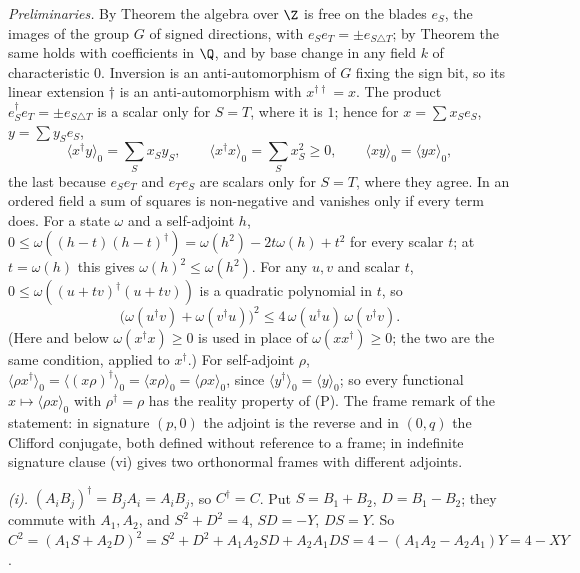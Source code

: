 \emph{Preliminaries.} By Theorem  the algebra over $\Z$ is free on the blades $e_{S}$, the images of the group $G$ of signed directions, with $e_{S}e_{T} = \pm e_{S \triangle T}$; by Theorem  the same holds with coefficients in $\Q$, and by base change in any field $k$ of characteristic $0$. Inversion is an anti-automorphism of $G$ fixing the sign bit, so its linear extension $\dagger$ is an anti-automorphism with $x^{\dagger\dagger} = x$. The product $e_{S}^{\dagger}e_{T} = \pm e_{S \triangle T}$ is a scalar only for $S = T$, where it is $1$; hence for $x = \sum x_{S}e_{S}$, $y = \sum y_{S}e_{S}$,
\[
\langle x^{\dagger}y\rangle_{0} = \sum_{S}x_{S}y_{S}, \qquad \langle x^{\dagger}x\rangle_{0} = \sum_{S}x_{S}^{2} \ge 0, \qquad \langle xy\rangle_{0} = \langle yx\rangle_{0},
\]
the last because $e_{S}e_{T}$ and $e_{T}e_{S}$ are scalars only for $S = T$, where they agree. In an ordered field a sum of squares is non-negative and vanishes only if every term does. For a state $\omega$ and a self-adjoint $h$, $0 \le \omega((h - t)(h - t)^{\dagger}) = \omega(h^{2}) - 2t\omega(h) + t^{2}$ for every scalar $t$; at $t = \omega(h)$ this gives $\omega(h)^{2} \le \omega(h^{2})$. For any $u, v$ and scalar $t$, $0 \le \omega((u + tv)^{\dagger}(u + tv))$ is a quadratic polynomial in $t$, so
\[
\bigl(\omega(u^{\dagger}v) + \omega(v^{\dagger}u)\bigr)^{2} \le 4\,\omega(u^{\dagger}u)\,\omega(v^{\dagger}v). \tag{CS}
\]
(Here and below $\omega(x^{\dagger}x) \ge 0$ is used in place of $\omega(xx^{\dagger}) \ge 0$; the two are the same condition, applied to $x^{\dagger}$.) For self-adjoint $\rho$, $\langle\rho x^{\dagger}\rangle_{0} = \langle(x\rho)^{\dagger}\rangle_{0} = \langle x\rho\rangle_{0} = \langle\rho x\rangle_{0}$, since $\langle y^{\dagger}\rangle_{0} = \langle y\rangle_{0}$; so every functional $x \mapsto \langle\rho x\rangle_{0}$ with $\rho^{\dagger} = \rho$ has the reality property of (P). The frame remark of the statement: in signature $(p,0)$ the adjoint is the reverse and in $(0,q)$ the Clifford conjugate, both defined without reference to a frame; in indefinite signature clause (vi) gives two orthonormal frames with different adjoints.

\emph{(i).} $(A_{i}B_{j})^{\dagger} = B_{j}A_{i} = A_{i}B_{j}$, so $C^{\dagger} = C$. Put $S = B_{1} + B_{2}$, $D = B_{1} - B_{2}$; they commute with $A_{1}, A_{2}$, and $S^{2} + D^{2} = 4$, $SD = -Y$, $DS = Y$. So $C^{2} = (A_{1}S + A_{2}D)^{2} = S^{2} + D^{2} + A_{1}A_{2}SD + A_{2}A_{1}DS = 4 - (A_{1}A_{2} - A_{2}A_{1})Y = 4 - XY$.

